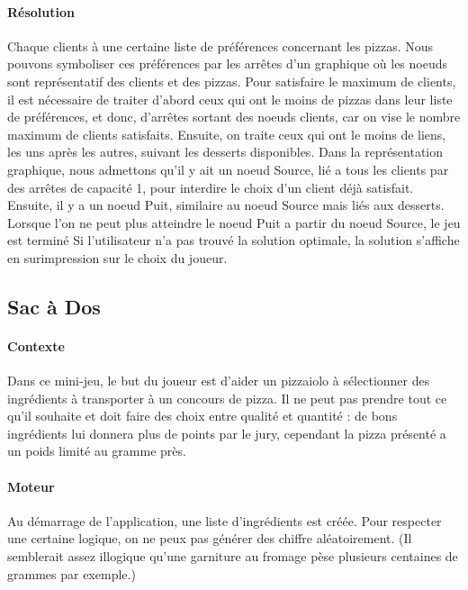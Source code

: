 		\paragraph{Résolution}
			Chaque clients à une certaine liste de préférences concernant les pizzas.
			Nous pouvons symboliser ces préférences par les arrêtes d'un graphique où
			 les noeuds sont représentatif des clients et des pizzas.
			Pour satisfaire le maximum de clients, il est nécessaire de traiter d'abord
			 ceux qui ont le moins de pizzas dans leur liste de préférences, et donc,
			 d'arrêtes sortant des noeuds clients, car on vise le nombre maximum de clients
			 satisfaits.
			Ensuite, on traite ceux qui ont le moins de liens, les uns après les autres,
			 suivant les desserts disponibles.
			Dans la représentation graphique, nous admettons qu'il y ait un noeud Source,
			 lié a tous les clients par des arrêtes de capacité 1, pour interdire le
			 choix d'un client déjà satisfait.
			Ensuite, il y a un noeud Puit, similaire au noeud Source mais liés aux
			 desserts.
			Lorsque l'on ne peut plus atteindre le noeud Puit a partir du noeud Source,
			 le jeu est terminé
			Si l'utilisateur n'a pas trouvé la solution optimale, la solution s'affiche
			 en surimpression sur le choix du joueur.

    \subsection{Sac à Dos}
        \paragraph{Contexte}
            Dans ce mini-jeu, le but du joueur est d'aider un pizzaiolo à
            sélectionner des ingrédients à transporter à un concours de pizza.
            Il ne peut pas prendre tout ce qu'il souhaite et doit faire des
            choix entre qualité et quantité : de bons ingrédients lui donnera
            plus de points par le jury, cependant la pizza présenté a un poids
            limité au gramme près.
        \paragraph{Moteur}
            Au démarrage de l'application, une liste d'ingrédients est créée.
            Pour respecter une certaine logique, on ne peux pas générer des
            chiffre aléatoirement. (Il semblerait assez illogique qu'une
            garniture au fromage pèse plusieurs centaines de grammes par
            exemple.)
